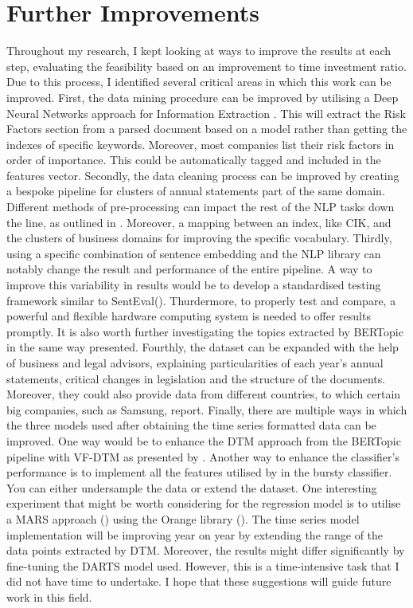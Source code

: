 \documentclass[12pt,MSc,a4paper,oneside]{muthesis}
\begin{document}
    \section{Further Improvements}
    Throughout my research, I kept looking at ways to improve the results at each step, evaluating the feasibility based on an improvement to time investment ratio. Due to this process, I identified several critical areas in which this work can be improved.
    First, the data mining procedure can be improved by utilising a Deep Neural Networks approach for Information Extraction \cite{Gogar2016DeepNN}. This will extract the Risk Factors section from a parsed document based on a model rather than getting the indexes of specific keywords. Moreover, most companies list their risk factors in order of importance. This could be automatically tagged and included in the features vector.
    Secondly, the data cleaning process can be improved by creating a bespoke pipeline for clusters of annual statements part of the same domain. Different methods of pre-processing can impact the rest of the NLP tasks down the line, as outlined in \cite{qi-etal-2018-pre}. Moreover, a mapping between an index, like CIK, and the clusters of business domains for improving the specific vocabulary.
    Thirdly, using a specific combination of sentence embedding and the NLP library can notably change the result and performance of the entire pipeline. A way to improve this variability in results would be to develop a standardised testing framework similar to SentEval(\cite{Conneau2017SupervisedLO}). Thurdermore, to properly test and compare, a powerful and flexible hardware computing system is needed to offer results promptly. It is also worth further investigating the topics extracted by BERTopic in the same way \cite{ABUHAY2018193} presented. Fourthly, the dataset can be expanded with the help of business and legal advisors, explaining particularities of each year's annual statements, critical changes in legislation and the structure of the documents. Moreover, they could also provide data from different countries, to which certain big companies, such as Samsung, report.
    Finally, there are multiple ways in which the three models used after obtaining the time series formatted data can be improved. One way would be to enhance the DTM approach from the BERTopic pipeline with VF-DTM as presented by \cite{HalimaBanu2016TrendingTA}. Another way to enhance the classifier's performance is to implement all the features utilised by \cite{Tattershall2019DetectingBT} in the bursty classifier. You can either undersample the data or extend the dataset. One interesting experiment that might be worth considering for the regression model is to utilise a MARS approach (\cite{wiki:mars}) using the Orange library (\cite{JMLR:demsar13a}). The time series model implementation will be improving year on year by extending the range of the data points extracted by DTM. Moreover, the results might differ significantly by fine-tuning the DARTS model used. However, this is a time-intensive task that I did not have time to undertake.
    I hope that these suggestions will guide future work in this field.
\end{document}
